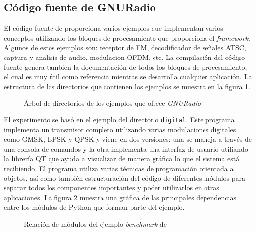\subsection{C\'odigo fuente de GNURadio}
El c\'odigo fuente de \gnuradio proporciona varios ejemplos que implementan varios conceptos
utilizando los bloques de procesamiento que proporciona el \emph{framework}. Algunos de estos
ejemplos son: receptor de FM, decodificador de se\~nales ATSC, captura y analisis de audio,
modulacion OFDM, etc. La compilaci\'on del c\'odigo fuente genera tambien la documentaci\'on de todos
los bloques de procesamiento, el cual es muy \'util como referencia mientras se desarrolla cualquier
aplicaci\'on. La estructura de los directorios que contienen los ejemplos se muestra en la figura
\ref{fig:extree}.

\begin{figure}[ht]
\DTsetlength{1.5em}{1em}{0.2em}{0.4pt}{1.6pt} %
	\vspace{0.5in}
	\caption{\'Arbol de directorios de los ejemplos que ofrece \emph{GNURadio}}
	\label{fig:extree}
\end{figure}

El experimento se bas\'o en el ejemplo del directorio \verb|digital|. Este programa implementa un
transmisor completo utilizando varias modulaciones digitales como GMSK, BPSK y QPSK y viene en dos
versiones: una se maneja a trav\'es de una consola de comandos y la otra implementa una interfaz de
usuario utiliando la librer\'ia QT que ayuda a visualizar de manera gr\'afica lo que el sistema est\'a
recibiendo. El programa utiliza varias t\'ecnicas de programaci\'on orientada a objetos, as\'i como
tambi\'en estructuraci\'on del c\'odigo de diferentes m\'odulos para separar todos los componentes
importantes y poder utilizarlos en otras aplicaciones. La figura \ref{fig:relbench} muestra una gr\'afica
de las principales dependencias entre los m\'odulos de Python que forman parte del ejemplo.

\begin{figure}[htp]
\centering
{}
\vspace{0.5in}
\caption{Relaci\'on de m\'odulos del ejemplo \emph{benchmark} de \gnuradio}
\label{fig:relbench}
\end{figure}

